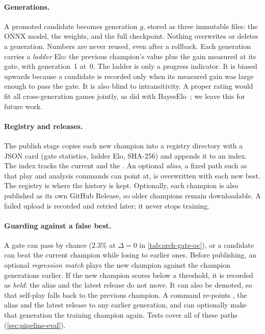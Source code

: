 \paragraph{Generations.}
A promoted candidate becomes generation $g$, stored as three immutable files: the ONNX
model, the weights, and the full checkpoint. Nothing overwrites or deletes a
generation. Numbers are never reused, even after a rollback. Each generation carries a
\emph{ladder} Elo: the previous champion's value plus the gain measured at its gate, with
generation~1 at~0. The ladder is only a progress indicator. It is biased upwards because a
candidate is recorded only when its measured gain was large enough to pass the gate. It is
also blind to intransitivity. A proper rating would fit all cross-generation games jointly,
as \katago{} did with BayesElo~\citep{coulom2010bayeselo,wu2019accelerating}; we leave this
for future work.

\paragraph{Registry and releases.}
The publish stage copies each new champion into a registry directory with a JSON card
(gate statistics, ladder Elo, SHA-256) and appends it to an index. The index tracks the
current  and the . An optional \emph{alias}, a fixed
path such as  that play and analysis commands can point
at, is overwritten with each new best. The registry is where the history is kept. Optionally, each champion is also published as its
own GitHub Release, so older champions remain downloadable. A failed upload is recorded and
retried later; it never stops training.

\paragraph{Guarding against a false best.}
A gate can pass by chance ($2.3\%$ at $\Delta=0$ in \cref{tab:orch-gate-oc}), or a
candidate can beat the current champion while losing to earlier ones. Before publishing, an
optional \emph{regression match} plays the new champion against the champion
 generations earlier. If the new champion scores below a
threshold, it is recorded as \emph{held}: the alias and the latest release do not move. It
can also be demoted, so that self-play falls back to the previous champion. A
 command re-points , the alias and the latest release to any
earlier generation, and can optionally make that generation the training champion again.
Tests cover all of these paths (\cref{sec:pipeline-eval}).
